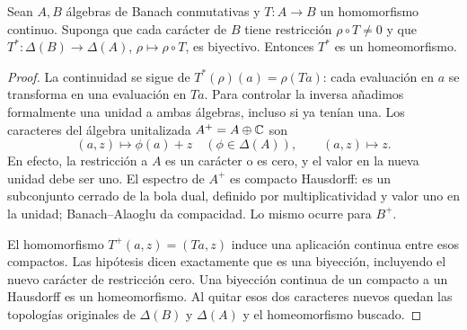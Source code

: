 \begin{lema}\label{v4:espectros-homeomorfismo}
Sean $A,B$ álgebras de Banach conmutativas y $T:A\to B$ un homomorfismo continuo. Suponga que cada carácter de $B$ tiene restricción $\rho\circ T\ne0$ y que $T^*: \Delta(B)\to\Delta(A)$, $\rho\mapsto\rho\circ T$, es biyectivo. Entonces $T^*$ es un homeomorfismo.
\end{lema}
\begin{proof}
La continuidad se sigue de $T^*(\rho)(a)=\rho(Ta)$: cada evaluación en $a$ se transforma en una evaluación en $Ta$. Para controlar la inversa añadimos formalmente una unidad a ambas álgebras, incluso si ya tenían una. Los caracteres del álgebra unitalizada $A^+=A\oplus\mathbb C$ son
\[
 (a,z)\longmapsto\phi(a)+z\quad(\phi\in\Delta(A)),
 \qquad (a,z)\longmapsto z.
\]
En efecto, la restricción a $A$ es un carácter o es cero, y el valor en la nueva unidad debe ser uno. El espectro de $A^+$ es compacto Hausdorff: es un subconjunto cerrado de la bola dual, definido por multiplicatividad y valor uno en la unidad; Banach--Alaoglu da compacidad. Lo mismo ocurre para $B^+$.

El homomorfismo $T^+(a,z)=(Ta,z)$ induce una aplicación continua entre esos compactos. Las hipótesis dicen exactamente que es una biyección, incluyendo el nuevo carácter de restricción cero. Una biyección continua de un compacto a un Hausdorff es un homeomorfismo. Al quitar esos dos caracteres nuevos quedan las topologías originales de $\Delta(B)$ y $\Delta(A)$ y el homeomorfismo buscado.
\end{proof}


